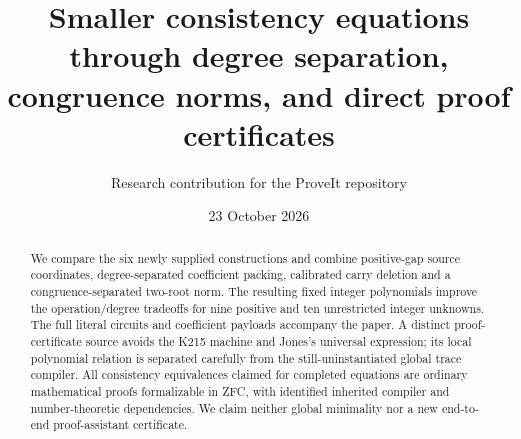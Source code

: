 \documentclass[11pt]{article}
\title{Smaller consistency equations through degree separation, congruence norms, and direct proof certificates}
\author{Research contribution for the ProveIt repository}
\date{23 October 2026}
\begin{document}
\maketitle
\begin{abstract}
We compare the six newly supplied constructions and combine positive-gap source coordinates, degree-separated coefficient packing, calibrated carry deletion and a congruence-separated two-root norm. The resulting fixed integer polynomials improve the operation/degree tradeoffs for nine positive and ten unrestricted integer unknowns. The full literal circuits and coefficient payloads accompany the paper. A distinct proof-certificate source avoids the K215 machine and Jones's universal expression; its local polynomial relation is separated carefully from the still-uninstantiated global trace compiler. All consistency equivalences claimed for completed equations are ordinary mathematical proofs formalizable in ZFC, with identified inherited compiler and number-theoretic dependencies. We claim neither global minimality nor a new end-to-end proof-assistant certificate.
\end{abstract}
\setcounter{tocdepth}{1}
\tableofcontents
\clearpage










\end{document}
